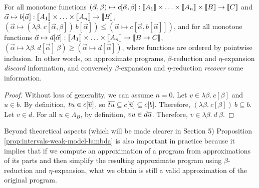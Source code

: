 \begin{proposition} \label{prop:intervals-weak-model-lambda} For all monotone functions $(\vec{\alpha}, \beta) \mapsto c[\vec{\alpha}, \beta] : \llbracket A_1 \rrbracket \times \ldots \times \llbracket A_n \rrbracket \times  \llbracket B \rrbracket \to \llbracket C \rrbracket$ and $\vec{\alpha} \mapsto b[\vec{\alpha}] : \llbracket A_1 \rrbracket \times \ldots \times \llbracket A_n \rrbracket \to \llbracket B \rrbracket$, $\left(\vec{\alpha} \mapsto (\lambda \beta.~  c[\vec{\alpha}, \beta])~ b[\vec{\alpha}]\right) \leq \left(\vec{\alpha} \mapsto c[\vec{\alpha}, b[\vec{\alpha}]]\right)$, %
and for all monotone functions $\vec{\alpha} \mapsto d[\vec{\alpha}] : \llbracket A_1 \rrbracket \times \ldots \times \llbracket A_n \rrbracket \to  \llbracket B \to C \rrbracket$,
$\left(\vec{\alpha} \mapsto \lambda \beta.~  d[\vec{\alpha}]~ \beta\right) \geq \left(\vec{\alpha} \mapsto d[\vec{\alpha}]\right)$,
where functions are ordered by pointwise inclusion.  In other words, on approximate programs, $\beta$-reduction and $\eta$-expansion \emph{discard} information, and conversely $\beta$-expansion and $\eta$-reduction \emph{recover} some information.
\end{proposition}

\begin{proof} Without loss of generality, we can assume $n=0$.
Let $v \in \lambda \beta.~ c[\beta]$ and $u \in b$. By definition, $tu \in c[\overline{u}]$, so $\overline{tu} \subseteq c[\overline{u}] \subseteq c[b]$. Therefore, $(\lambda \beta.~ c[\beta])~ b \subseteq b$.
Let $v \in d$. For all $u \in \Lambda_B$, by definition, $vu \in d\overline{u}$. Therefore, $v \in \lambda \beta.~ d~ \beta$.
\end{proof}

Beyond theoretical aspects (which will be made clearer in Section 5)
Proposition \ref{prop:intervals-weak-model-lambda} is also important in practice because it implies that if we compute an approximation of a program from approximations of its parts and then simplify the resulting approximate program using $\beta$-reduction and $\eta$-expansion, what we obtain is still a valid approximation of the original program.


